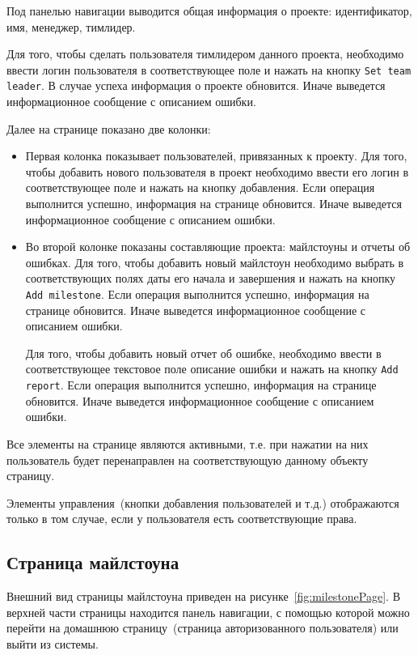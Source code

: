 Под панелью навигации выводится общая информация о проекте: идентификатор, имя, менеджер, тимлидер.

Для того, чтобы сделать пользователя тимлидером данного проекта, необходимо ввести логин пользователя в соответствующее поле и нажать на кнопку \texttt{Set team leader}. В случае успеха информация о проекте обновится. Иначе выведется информационное сообщение с описанием ошибки.

Далее на странице показано две колонки:
\begin{itemize}
\item Первая колонка показывает пользователей, привязанных к проекту. Для того, чтобы добавить нового пользователя в проект необходимо ввести его логин в соответствующее поле и нажать на кнопку добавления. Если операция выполнится успешно, информация на странице обновится. Иначе выведется информационное сообщение с описанием ошибки.

\item Во второй колонке показаны составляющие проекта: майлстоуны и отчеты об ошибках. Для того, чтобы добавить новый майлстоун необходимо выбрать в соответствующих полях даты его начала и завершения и нажать на кнопку \texttt{Add milestone}. Если операция выполнится успешно, информация на странице обновится. Иначе выведется информационное сообщение с описанием ошибки.

Для того, чтобы добавить новый отчет об ошибке, необходимо ввести в соответствующее текстовое поле описание ошибки и нажать на кнопку \texttt{Add report}. Если операция выполнится успешно, информация на странице обновится. Иначе выведется информационное сообщение с описанием ошибки.
\end{itemize}

Все элементы на странице являются активными, т.е. при нажатии на них пользователь будет перенаправлен на соответствующую данному объекту страницу. 

Элементы управления~(кнопки добавления пользователей и т.д.) отображаются только в том случае, если у пользователя есть соответствующие права.

\subsection{Страница майлстоуна}
Внешний вид страницы майлстоуна приведен на рисунке~\ref{fig:milestonePage}. В верхней части страницы находится панель навигации, с помощью которой можно перейти на домашнюю страницу~(страница авторизованного пользователя) или выйти из системы. 

